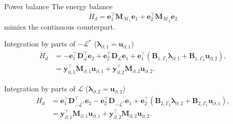 \documentclass[aspectratio=169]{ISAE-Beamer}
\begin{document}
\begin{frame}{Power balance}
The energy balance
\begin{equation*}
\dot{H}_d = \mathbf{e}_1^\top \mathbf{M}_{\mathcal{M}_1} \dot{\mathbf{e}}_1 + \mathbf{e}_2^\top \mathbf{M}_{\mathcal{M}_2} \dot{\mathbf{e}}_2
\end{equation*}
mimics the continuous counterpart.
\begin{exampleblock}{Integration by parts of $-\mathcal{L}^*$ ($\bm{\lambda}_{\partial, 1} = \bm{u}_{\partial, 1}$)}
\begin{equation*}
\begin{aligned}
\dot{H}_d &= -\mathbf{e}_1^\top \mathbf{D}_\mathcal{L}^\top {\mathbf{e}}_2 + \mathbf{e}_2^\top\mathbf{D}_\mathcal{L} {\mathbf{e}}_1 + \mathbf{e}_1^\top (\mathbf{B}_{1, \Gamma_1} \bm{\lambda}_{\partial, 1} + \mathbf{B}_{1, \Gamma_2} \mathbf{u}_{\partial, 2} ), \\
&= \mathbf{y}_{\partial, 1}^\top \mathbf{M}_{\partial, 1} \mathbf{u}_{\partial, 1} + \mathbf{y}_{\partial, 2}^\top \mathbf{M}_{\partial, 2} \mathbf{u}_{\partial, 2}. 
\end{aligned}
\end{equation*}
\end{exampleblock}
\begin{exampleblock}{Integration by parts of $\mathcal{L}$ ($\bm{\lambda}_{\partial, 2} = \bm{u}_{\partial, 2}$)}
	\begin{equation*}
	\begin{aligned}
	\dot{H}_d &= \mathbf{e}_1^\top \mathbf{D}_{-\mathcal{L}^*}^\top {\mathbf{e}}_2 - \mathbf{e}_2^\top\mathbf{D}_{-\mathcal{L}^*} {\mathbf{e}}_1 + \mathbf{e}_2^\top (\mathbf{B}_{2, \Gamma_2} \bm{\lambda}_{\partial, 2} + \mathbf{B}_{2, \Gamma_1} \mathbf{u}_{\partial, 1} ), \\
	&= \mathbf{y}_{\partial, 1}^\top \mathbf{M}_{\partial, 1} \mathbf{u}_{\partial, 1} + \mathbf{y}_{\partial, 2}^\top \mathbf{M}_{\partial, 2} \mathbf{u}_{\partial, 2}. 
	\end{aligned}
	\end{equation*}
\end{exampleblock}
\end{frame}
\end{document}
